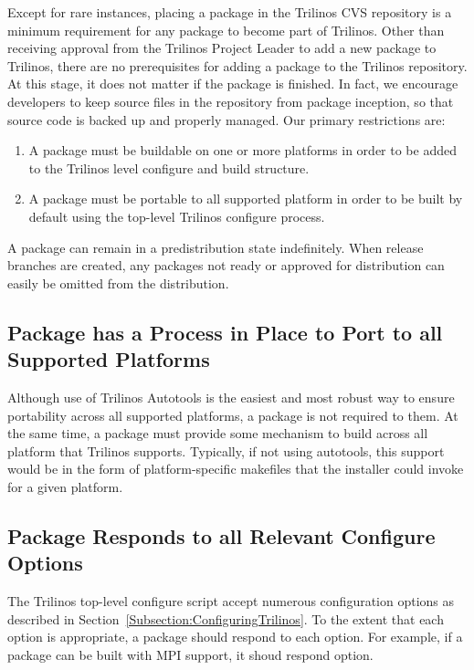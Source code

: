 \documentclass[12pt,relax]{TrilinosDevGuide}
\begin{document}
Except for rare instances, placing a package in the Trilinos CVS
repository is a minimum requirement for any package to become part of 
Trilinos.  Other than receiving approval from the Trilinos Project Leader to 
add a new package to Trilinos, there are no prerequisites for adding a  
package to the Trilinos repository.  At this stage, it does not matter if the 
package is finished.  In fact, we encourage
developers to keep source files in the repository from package
inception, so that source code is backed up and properly managed.
Our primary restrictions are:
\begin{enumerate}
\item A package must be buildable on one or more platforms in order to
be added to the Trilinos level configure and build 
structure.  
\item A package must be portable to all supported platform in order to
be built by default using the top-level Trilinos configure process.
\end{enumerate}
A package can remain in a predistribution state indefinitely.  
When release branches are created, any packages not ready or approved for 
distribution can easily be omitted from the distribution.

\subsection{Package has a Process in Place to Port to all Supported Platforms}
Although use of Trilinos Autotools is the easiest and most robust way
to ensure portability across all supported platforms, a package is not
required to them.  At the same time, a package must provide some
mechanism to build across all platform that Trilinos supports.
Typically, if not using autotools, this support would be in the form
of platform-specific makefiles that the installer could invoke for a
given platform.

\subsection{Package Responds to all Relevant Configure Options}

The Trilinos top-level configure script accept numerous configuration
options as described in Section~\ref{Subsection:ConfiguringTrilinos}.
To the extent that each option is appropriate, a package should
respond to each option.  For example, if a package can be built with
MPI support, it shoud respond  option.
\end{document}
